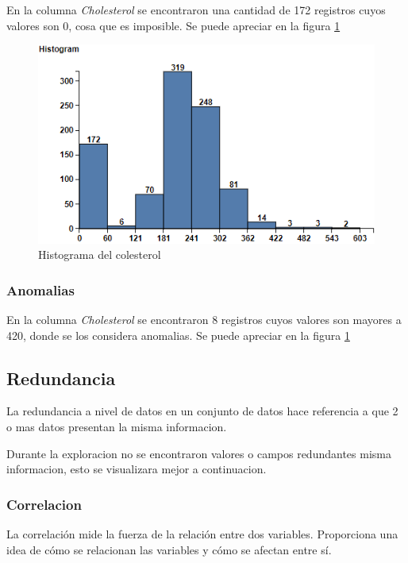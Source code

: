 \documentclass[12pt, letterpaper]{article}
\begin{document}
En la columna \textit{Cholesterol} se encontraron una cantidad de 172 registros cuyos valores 
son 0, cosa que es imposible. Se puede apreciar en la figura \ref{fig:colesterol}

\begin{figure}
    \centering
    \includegraphics[scale=1]{Cholesterol.png}
    \caption{Histograma del colesterol}
    \label{fig:colesterol}
\end{figure}


\subsubsection{Anomalias}
En la columna \textit{Cholesterol} se encontraron 8 registros cuyos valores son mayores a 420,
donde se los considera anomalias. Se puede apreciar en la figura \ref{fig:colesterol}

\subsection{Redundancia}
La redundancia a nivel de datos en un conjunto de datos hace referencia a que 2 o mas datos
presentan la misma informacion.

Durante la exploracion no se encontraron valores o campos redundantes
misma informacion, esto se visualizara mejor a continuacion.
\subsubsection{Correlacion}
La correlación mide la fuerza de la relación entre dos variables. 
Proporciona una idea de cómo se relacionan las variables y cómo se afectan entre sí. 
\cite{correlacion}
\end{document}
